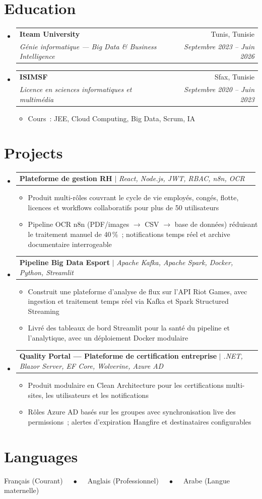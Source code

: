\documentclass[letterpaper,11pt]{article}
\makeatletter
\newcommand{\resumeItem}[1]{
  \item\small{#1}
}
\newcommand{\resumeSubheading}[4]{
  \vspace{1pt}\item
    \begin{tabular*}{0.97\textwidth}[t]{l@{\extracolsep{\fill}}r}
      \textbf{#1} & #2 \\
      \textit{\small#3} & \textit{\small #4} \\
    \end{tabular*}\vspace{-2pt}
}
\newcommand{\resumeProjectHeading}[2]{
    \item
    \begin{tabular*}{0.97\textwidth}{l@{\extracolsep{\fill}}r}
      \small#1 & #2 \\
    \end{tabular*}\vspace{-2pt}
}
\newcommand{\resumeSubHeadingListStart}{\begin{itemize}[leftmargin=0.15in, label={}]}
\newcommand{\resumeSubHeadingListEnd}{\end{itemize}}
\newcommand{\resumeItemListStart}{\begin{itemize}[leftmargin=0.18in,itemsep=1pt]}
\newcommand{\resumeItemListEnd}{\end{itemize}\vspace{1pt}}
\makeatother
\begin{document}
\section{Education}
  \resumeSubHeadingListStart
    \resumeSubheading
      {Iteam University}{Tunis, Tunisie}
      {Génie informatique --- Big Data \& Business Intelligence}{Septembre 2023 -- Juin 2026}
    \resumeSubheading
      {ISIMSF}{Sfax, Tunisie}
      {Licence en sciences informatiques et multimédia}{Septembre 2020 -- Juin 2023}
      \resumeItemListStart
        \resumeItem{Cours~: JEE, Cloud Computing, Big Data, Scrum, IA}
      \resumeItemListEnd
  \resumeSubHeadingListEnd


\section{Projects}
    \resumeSubHeadingListStart
      \resumeProjectHeading
          {\textbf{Plateforme de gestion RH} $|$ \emph{React, Node.js, JWT, RBAC, n8n, OCR}}{}
          \resumeItemListStart
            \resumeItem{Produit multi-rôles couvrant le cycle de vie employés, congés, flotte, licences et workflows collaboratifs pour plus de 50 utilisateurs}
            \resumeItem{Pipeline OCR n8n (PDF/images $\rightarrow$ CSV $\rightarrow$ base de données) réduisant le traitement manuel de 40\,\%~; notifications temps réel et archive documentaire interrogeable}
          \resumeItemListEnd

      \resumeProjectHeading
          {\textbf{Pipeline Big Data Esport} $|$ \emph{Apache Kafka, Apache Spark, Docker, Python, Streamlit}}{}
          \resumeItemListStart
            \resumeItem{Construit une plateforme d'analyse de flux sur l'API Riot Games, avec ingestion et traitement temps réel via Kafka et Spark Structured Streaming}
            \resumeItem{Livré des tableaux de bord Streamlit pour la santé du pipeline et l'analytique, avec un déploiement Docker modulaire}
          \resumeItemListEnd

      \resumeProjectHeading
          {\textbf{Quality Portal --- Plateforme de certification entreprise} $|$ \emph{.NET, Blazor Server, EF Core, Wolverine, Azure AD}}{}
          \resumeItemListStart
            \resumeItem{Produit modulaire en Clean Architecture pour les certifications multi-sites, les utilisateurs et les notifications}
            \resumeItem{Rôles Azure AD basés sur les groupes avec synchronisation live des permissions~; alertes d'expiration Hangfire et destinataires configurables}
          \resumeItemListEnd

    \resumeSubHeadingListEnd


\section{Languages}
 \begin{itemize}[leftmargin=0.15in, label={}]
    \small{\item{
     Français (Courant) $\quad\bullet\quad$ Anglais (Professionnel) $\quad\bullet\quad$ Arabe (Langue maternelle)
    }}
 \end{itemize}
\end{document}
